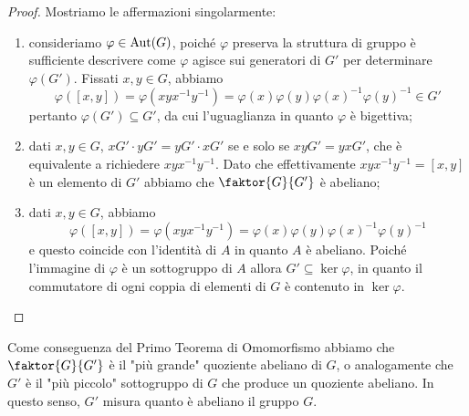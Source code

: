 \documentclass[11pt]{scrartcl}
\begin{document}
\begin{proof}
    Mostriamo le affermazioni singolarmente:
    \begin{enumerate}[(1)]
        \item consideriamo $\varphi \in \operatorname{Aut}(G)$, poiché $\varphi$ preserva la struttura
        di gruppo è sufficiente descrivere come $\varphi$ agisce sui 
        generatori di $G'$ per determinare $\varphi(G')$. 
        Fissati $x, y \in G$, abbiamo 
        \[
            \varphi([x, y]) = \varphi(xyx^{-1}y^{-1}) = \varphi(x)\varphi(y)
            \varphi(x)^{-1}\varphi(y)^{-1} \in G'
        \]pertanto $\varphi(G') \subseteq G'$, da cui l'uguaglianza in quanto 
        $\varphi$ è bigettiva;
        \item dati $x, y \in G$, $xG'\cdot yG' = yG'\cdot xG'$ se e solo se 
        $xyG' = yxG'$, che è equivalente a richiedere $xyx^{-1}y^{-1}$. 
        Dato che effettivamente $xyx^{-1}y^{-1} = [x, y]$ è un elemento di $G'$
        abbiamo che $\faktor{G}{G'}$ è abeliano;
        \item dati $x, y \in G$, abbiamo 
        \[
            \varphi([x, y]) = \varphi(xyx^{-1}y^{-1}) = 
        \varphi(x)\varphi(y)\varphi(x)^{-1}\varphi(y)^{-1}
        \]
        e questo coincide con
        l'identità di $A$ in quanto $A$ è abeliano. Poiché l'immagine di $\varphi$
        è un sottogruppo di $A$ allora $G' \subseteq \ker\varphi$, in quanto
        il commutatore di ogni coppia di elementi di $G$ è contenuto in $\ker \varphi$.
    \end{enumerate}
\end{proof}

\begin{remark}
    Come conseguenza del Primo Teorema di Omomorfismo abbiamo che $\faktor{G}{G'}$ è 
    il "più grande" quoziente abeliano di $G$, o analogamente che 
    $G'$ è il "più piccolo" sottogruppo di $G$ che produce un quoziente abeliano.
    In questo senso, $G'$ misura quanto è abeliano il gruppo $G$.
\end{remark}
\end{document}
